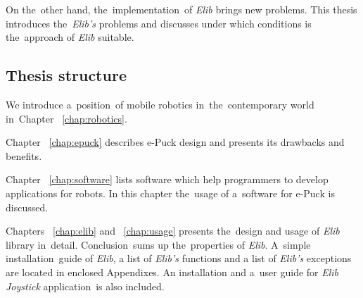   On the~other hand, the~implementation~of {\it Elib} brings new problems.
  This thesis introduces the~{\it Elib's} problems and discusses 
  under which conditions is the~approach of {\it Elib} suitable.	
  \subsection*{Thesis structure}
  We introduce a~position~of mobile robotics in~the~contemporary world in~Chapter ~\ref{chap:robotics}.

  Chapter ~\ref{chap:epuck} describes e-Puck design and presents its drawbacks and benefits.

  Chapter ~\ref{chap:software} lists software which help programmers to develop applications for robots.
  In this chapter the~usage of a~software for e-Puck is discussed. 
  
  Chapters ~\ref{chap:elib} and ~\ref{chap:usage} presents the~design and usage of {\it Elib} library in~detail.
  Conclusion~sums up the~properties of {\it Elib}.
  A~simple installation~guide of {\it Elib}, a list of {\it Elib's} functions and a list of {\it Elib's} exceptions  are located in enclosed Appendixes.
  An installation and a~user guide for {\it Elib Joystick} application~is also included. 


